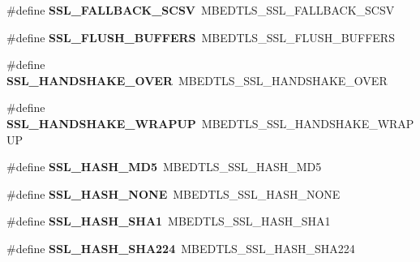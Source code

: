 \begin{DoxyCompactItemize}
\item 
\mbox{\label{compat-1_83_8h_ac54e7a26d05421b1a8105864ce9a486d}} 
\#define {\bfseries S\+S\+L\+\_\+\+F\+A\+L\+L\+B\+A\+C\+K\+\_\+\+S\+C\+SV}~M\+B\+E\+D\+T\+L\+S\+\_\+\+S\+S\+L\+\_\+\+F\+A\+L\+L\+B\+A\+C\+K\+\_\+\+S\+C\+SV
\item 
\mbox{\label{compat-1_83_8h_afd3c0220986c9d2ece9f58c5c2e3b4c2}} 
\#define {\bfseries S\+S\+L\+\_\+\+F\+L\+U\+S\+H\+\_\+\+B\+U\+F\+F\+E\+RS}~M\+B\+E\+D\+T\+L\+S\+\_\+\+S\+S\+L\+\_\+\+F\+L\+U\+S\+H\+\_\+\+B\+U\+F\+F\+E\+RS
\item 
\mbox{\label{compat-1_83_8h_a96be469a65bac699a970984d82526131}} 
\#define {\bfseries S\+S\+L\+\_\+\+H\+A\+N\+D\+S\+H\+A\+K\+E\+\_\+\+O\+V\+ER}~M\+B\+E\+D\+T\+L\+S\+\_\+\+S\+S\+L\+\_\+\+H\+A\+N\+D\+S\+H\+A\+K\+E\+\_\+\+O\+V\+ER
\item 
\mbox{\label{compat-1_83_8h_ae9fa622f5ca76455f8c69055d07e8e1f}} 
\#define {\bfseries S\+S\+L\+\_\+\+H\+A\+N\+D\+S\+H\+A\+K\+E\+\_\+\+W\+R\+A\+P\+UP}~M\+B\+E\+D\+T\+L\+S\+\_\+\+S\+S\+L\+\_\+\+H\+A\+N\+D\+S\+H\+A\+K\+E\+\_\+\+W\+R\+A\+P\+UP
\item 
\mbox{\label{compat-1_83_8h_aea01ccea55dba8a09c2d0cdba374cd2c}} 
\#define {\bfseries S\+S\+L\+\_\+\+H\+A\+S\+H\+\_\+\+M\+D5}~M\+B\+E\+D\+T\+L\+S\+\_\+\+S\+S\+L\+\_\+\+H\+A\+S\+H\+\_\+\+M\+D5
\item 
\mbox{\label{compat-1_83_8h_a813754e3f260fb5cd1ab79b9e1ddcf3a}} 
\#define {\bfseries S\+S\+L\+\_\+\+H\+A\+S\+H\+\_\+\+N\+O\+NE}~M\+B\+E\+D\+T\+L\+S\+\_\+\+S\+S\+L\+\_\+\+H\+A\+S\+H\+\_\+\+N\+O\+NE
\item 
\mbox{\label{compat-1_83_8h_ad7eefec922748c7c1bff814c9b5f76d3}} 
\#define {\bfseries S\+S\+L\+\_\+\+H\+A\+S\+H\+\_\+\+S\+H\+A1}~M\+B\+E\+D\+T\+L\+S\+\_\+\+S\+S\+L\+\_\+\+H\+A\+S\+H\+\_\+\+S\+H\+A1
\item 
\mbox{\label{compat-1_83_8h_a9a08b5f7e06299cee75305b73e1a9dc5}} 
\#define {\bfseries S\+S\+L\+\_\+\+H\+A\+S\+H\+\_\+\+S\+H\+A224}~M\+B\+E\+D\+T\+L\+S\+\_\+\+S\+S\+L\+\_\+\+H\+A\+S\+H\+\_\+\+S\+H\+A224
\item 

\end{DoxyCompactItemize}
